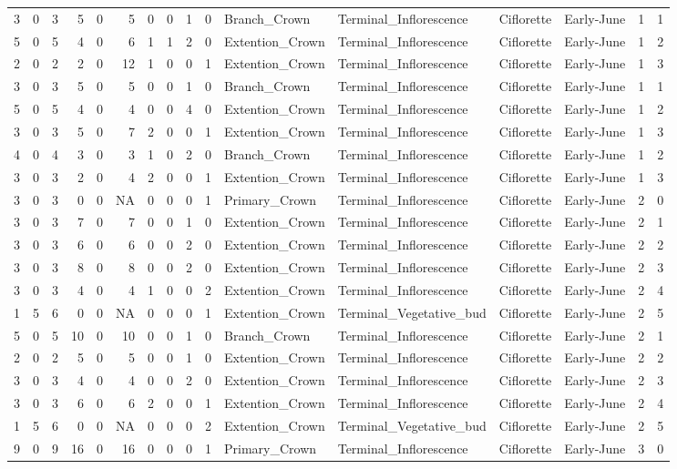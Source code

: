 \documentclass[]{article}
\begin{document}
\begin{longtable}[]{@{}rrrrrrrrrrllllrl@{}}
3 & 0 & 3 & 5 & 0 & 5 & 0 & 0 & 1 & 0 & Branch\_Crown &
Terminal\_Inflorescence & Ciflorette & Early-June & 1 & 1\tabularnewline
5 & 0 & 5 & 4 & 0 & 6 & 1 & 1 & 2 & 0 & Extention\_Crown &
Terminal\_Inflorescence & Ciflorette & Early-June & 1 & 2\tabularnewline
2 & 0 & 2 & 2 & 0 & 12 & 1 & 0 & 0 & 1 & Extention\_Crown &
Terminal\_Inflorescence & Ciflorette & Early-June & 1 & 3\tabularnewline
3 & 0 & 3 & 5 & 0 & 5 & 0 & 0 & 1 & 0 & Branch\_Crown &
Terminal\_Inflorescence & Ciflorette & Early-June & 1 & 1\tabularnewline
5 & 0 & 5 & 4 & 0 & 4 & 0 & 0 & 4 & 0 & Extention\_Crown &
Terminal\_Inflorescence & Ciflorette & Early-June & 1 & 2\tabularnewline
3 & 0 & 3 & 5 & 0 & 7 & 2 & 0 & 0 & 1 & Extention\_Crown &
Terminal\_Inflorescence & Ciflorette & Early-June & 1 & 3\tabularnewline
4 & 0 & 4 & 3 & 0 & 3 & 1 & 0 & 2 & 0 & Branch\_Crown &
Terminal\_Inflorescence & Ciflorette & Early-June & 1 & 2\tabularnewline
3 & 0 & 3 & 2 & 0 & 4 & 2 & 0 & 0 & 1 & Extention\_Crown &
Terminal\_Inflorescence & Ciflorette & Early-June & 1 & 3\tabularnewline
3 & 0 & 3 & 0 & 0 & NA & 0 & 0 & 0 & 1 & Primary\_Crown &
Terminal\_Inflorescence & Ciflorette & Early-June & 2 & 0\tabularnewline
3 & 0 & 3 & 7 & 0 & 7 & 0 & 0 & 1 & 0 & Extention\_Crown &
Terminal\_Inflorescence & Ciflorette & Early-June & 2 & 1\tabularnewline
3 & 0 & 3 & 6 & 0 & 6 & 0 & 0 & 2 & 0 & Extention\_Crown &
Terminal\_Inflorescence & Ciflorette & Early-June & 2 & 2\tabularnewline
3 & 0 & 3 & 8 & 0 & 8 & 0 & 0 & 2 & 0 & Extention\_Crown &
Terminal\_Inflorescence & Ciflorette & Early-June & 2 & 3\tabularnewline
3 & 0 & 3 & 4 & 0 & 4 & 1 & 0 & 0 & 2 & Extention\_Crown &
Terminal\_Inflorescence & Ciflorette & Early-June & 2 & 4\tabularnewline
1 & 5 & 6 & 0 & 0 & NA & 0 & 0 & 0 & 1 & Extention\_Crown &
Terminal\_Vegetative\_bud & Ciflorette & Early-June & 2 &
5\tabularnewline
5 & 0 & 5 & 10 & 0 & 10 & 0 & 0 & 1 & 0 & Branch\_Crown &
Terminal\_Inflorescence & Ciflorette & Early-June & 2 & 1\tabularnewline
2 & 0 & 2 & 5 & 0 & 5 & 0 & 0 & 1 & 0 & Extention\_Crown &
Terminal\_Inflorescence & Ciflorette & Early-June & 2 & 2\tabularnewline
3 & 0 & 3 & 4 & 0 & 4 & 0 & 0 & 2 & 0 & Extention\_Crown &
Terminal\_Inflorescence & Ciflorette & Early-June & 2 & 3\tabularnewline
3 & 0 & 3 & 6 & 0 & 6 & 2 & 0 & 0 & 1 & Extention\_Crown &
Terminal\_Inflorescence & Ciflorette & Early-June & 2 & 4\tabularnewline
1 & 5 & 6 & 0 & 0 & NA & 0 & 0 & 0 & 2 & Extention\_Crown &
Terminal\_Vegetative\_bud & Ciflorette & Early-June & 2 &
5\tabularnewline
9 & 0 & 9 & 16 & 0 & 16 & 0 & 0 & 0 & 1 & Primary\_Crown &
Terminal\_Inflorescence & Ciflorette & Early-June & 3 & 0\tabularnewline

\end{longtable}
\end{document}
